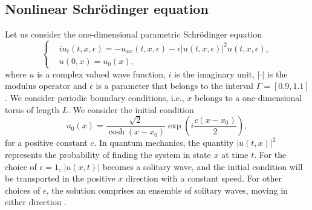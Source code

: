 \subsection{Nonlinear Schr\"odinger equation} \label{chap:NuRe:1.2} Let us consider the one-dimensional parametric Schr\"odinger equation
\begin{equation} \label{eq:NuRe:10}
\left\{
\begin{aligned}
	& i u_t(t,x,\epsilon) = - u_{xx}(t,x,\epsilon) - \epsilon |u(t,x,\epsilon)|^2 u(t,x,\epsilon),\\
	& u(0,x) = u_0(x),
\end{aligned}
\right.
\end{equation}
where $u$ is a complex valued wave function, $i$ is the imaginary unit, $|\cdot|$ is the modulus operator and $\epsilon$ is a parameter that belongs to the interval $\Gamma = [0.9,1.1]$. We consider periodic boundary conditions, i.e., $x$ belongs to a one-dimensional torus of length $L$. We consider the initial condition
\begin{equation} \label{eq:NuRe:11}
	u_0(x) = \frac{\sqrt 2}{\cosh(x - x_0)} \exp(i\frac{c(x-x_0)}{2}),
\end{equation}
for a positive constant $c$. In quantum mechanics, the quantity $|u(t,x)|^2$ represents the probability of finding the system in state $x$ at time $t$. For the choice of $\epsilon = 1$, $|u(x,t)|$ becomes a solitary wave, and the initial condition will be transported in the positive $x$ direction with a constant speed. For other choices of $\epsilon$, the solution comprises an ensemble of solitary waves, moving in either direction \cite{Faou:2012vh}. 

